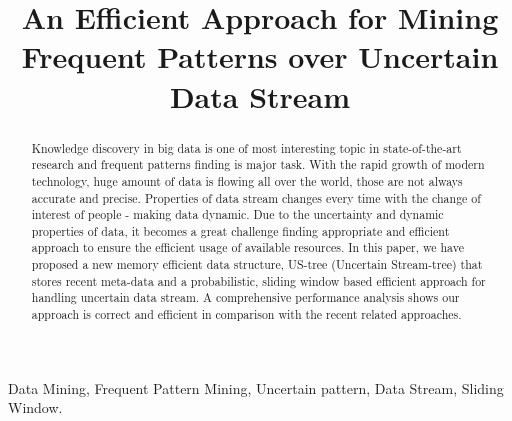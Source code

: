 \documentclass[conference]{IEEEtran}
\begin{document}
\title{An Efficient Approach for Mining Frequent Patterns over Uncertain Data Stream}
\author{
}
\maketitle
\begin{abstract}
Knowledge discovery in big data is one of most interesting topic in state-of-the-art research and frequent patterns finding is major task. With the rapid growth of modern technology, huge amount of data is flowing all over the world, those are not always accurate and precise. Properties of data stream changes every time with the change of interest of people - making data dynamic. Due to the uncertainty and dynamic properties of data, it becomes a great challenge finding appropriate and efficient approach to ensure the efficient usage of available resources. In this paper, we have proposed a new memory efficient data structure, US-tree (Uncertain Stream-tree) that stores recent meta-data and a probabilistic, sliding window based efficient approach for handling uncertain data stream. A comprehensive performance analysis shows our approach is correct and efficient in comparison with the recent related approaches.
\end{abstract}
\begin{IEEEkeywords}
Data Mining, Frequent Pattern Mining, Uncertain pattern, Data Stream, Sliding Window.
\end{IEEEkeywords}
\IEEEpeerreviewmaketitle
\end{document}
